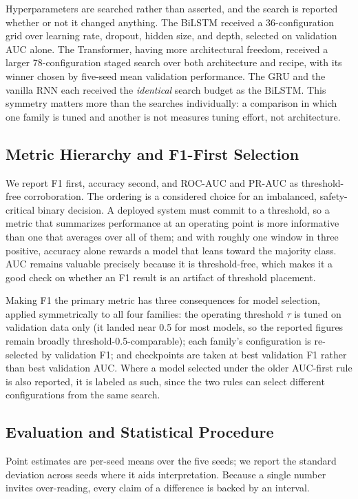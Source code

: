 \documentclass[mti,article,submit,moreauthors]{Definitions/mdpi}
\begin{document}
Hyperparameters are searched rather than asserted, and the search is reported whether or not it changed anything. The BiLSTM received a 36-configuration grid over learning rate, dropout, hidden size, and depth, selected on validation AUC alone. The Transformer, having more architectural freedom, received a larger 78-configuration staged search over both architecture and recipe, with its winner chosen by five-seed mean validation performance. The GRU and the vanilla RNN each received the \emph{identical} search budget as the BiLSTM. This symmetry matters more than the searches individually: a comparison in which one family is tuned and another is not measures tuning effort, not architecture.

\subsection{Metric Hierarchy and F1-First Selection}
\label{sec:metrics}

We report F1 first, accuracy second, and ROC-AUC and PR-AUC as threshold-free corroboration. The ordering is a considered choice for an imbalanced, safety-critical binary decision. A deployed system must commit to a threshold, so a metric that summarizes performance at an operating point is more informative than one that averages over all of them; and with roughly one window in three positive, accuracy alone rewards a model that leans toward the majority class. AUC remains valuable precisely because it is threshold-free, which makes it a good check on whether an F1 result is an artifact of threshold placement.

Making F1 the primary metric has three consequences for model selection, applied symmetrically to all four families: the operating threshold $\tau$ is tuned on validation data only (it landed near 0.5 for most models, so the reported figures remain broadly threshold-0.5-comparable); each family's configuration is re-selected by validation F1; and checkpoints are taken at best validation F1 rather than best validation AUC. Where a model selected under the older AUC-first rule is also reported, it is labeled as such, since the two rules can select different configurations from the same search.

\subsection{Evaluation and Statistical Procedure}
\label{sec:evaluation}

Point estimates are per-seed means over the five seeds; we report the standard deviation across seeds where it aids interpretation. Because a single number invites over-reading, every claim of a difference is backed by an interval.
\end{document}
